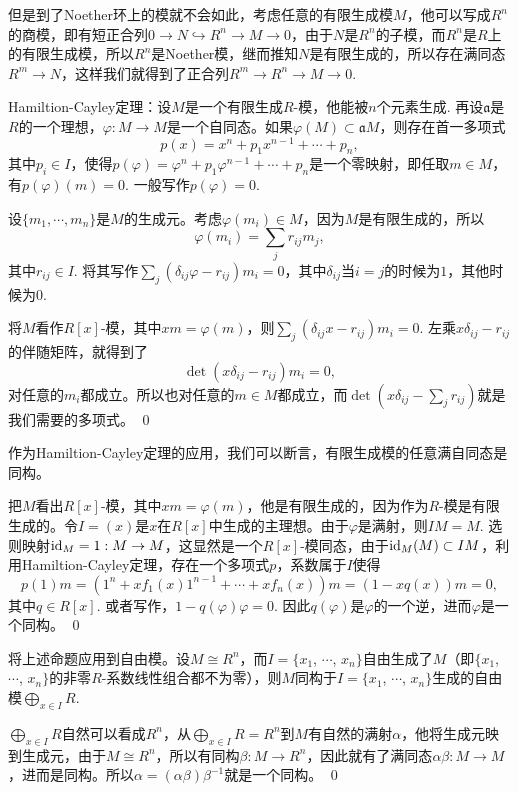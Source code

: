 但是到了Noether环上的模就不会如此，考虑任意的有限生成模$M$，他可以写成$R^n$的商模，即有短正合列$0\to N \hookrightarrow R^n \to M\to 0$，由于$N$是$R^n$的子模，而$R^n$是$R$上的有限生成模，所以$R^n$是Noether模，继而推知$N$是有限生成的，所以存在满同态$R^m\to N$，这样我们就得到了正合列$R^m\to R^n\to M\to 0$.

\theo Hamiltion-Cayley定理：设$M$是一个有限生成$R$-模，他能被$n$个元素生成. 再设$\mathfrak{a}$是$R$的一个理想，$\varphi:M\to M$是一个自同态。如果$\varphi(M)\subset \mathfrak{a}M$，则存在首一多项式
\[
	p(x)=x^n+p_1x^{n-1}+\cdots+p_n,
\]
其中$p_i\in I$，使得$p(\varphi)=\varphi^n+p_1\varphi^{n-1}+\cdots+p_n$是一个零映射，即任取$m\in M$，有$p(\varphi)(m)=0$. 一般写作$p(\varphi)=0$.

\proof
	设$\{m_1,\cdots,m_n\}$是$M$的生成元。考虑$\varphi(m_i)\in M$，因为$M$是有限生成的，所以
	\[
	\varphi(m_i)=\sum_{j}r_{ij}m_j,
	\]
	其中$r_{ij}\in I$. 将其写作$\sum_{j}(\delta_{ij}\varphi-r_{ij})m_i=0$，其中$\delta_{ij}$当$i=j$的时候为$1$，其他时候为$0$.

	将$M$看作$R[x]$-模，其中$xm=\varphi(m)$，则$\sum_{j}(\delta_{ij}x-r_{ij})m_i=0$. 左乘$x\delta_{ij}-r_{
	ij}$的伴随矩阵，就得到了
	\[
	\det\left(x\delta_{ij}-r_{ij}\right)m_i=0,
	\]
	对任意的$m_i$都成立。所以也对任意的$m\in M$都成立，而$\det\left(x\delta_{ij}-\sum_{j}r_{ij}\right)$就是我们需要的多项式。
\qed

\para 作为Hamiltion-Cayley定理的应用，我们可以断言，有限生成模的任意满自同态是同构。

\proof
	把$M$看出$R[x]$-模，其中$xm=\varphi(m)$，他是有限生成的，因为作为$R$-模是有限生成的。令$I=(x)$是$x$在$R[x]$中生成的主理想。由于$\varphi$是满射，则$IM=M$. 选则映射$\operatorname{id}_M=1:M\to M$，这显然是一个$R[x]$-模同态，由于$\operatorname{id}_M(M)\subset IM$，利用Hamiltion-Cayley定理，存在一个多项式$p$，系数属于$I$使得
	\[
	p(1)m=\left(1^n+xf_1(x)1^{n-1}+\cdots+xf_n(x)\right)m=(1-xq(x))m=0,
	\]
	其中$q\in R[x]$. 或者写作，$1-q(\varphi)\varphi=0$. 因此$q(\varphi)$是$\varphi$的一个逆，进而$\varphi$是一个同构。
\qed

\para 将上述命题应用到自由模。设$M\cong R^n$，而$I=\{x_1$, $\cdots$, $x_n\}$自由生成了$M$（即$\{x_1$, $\cdots$, $x_n\}$的非零$R$-系数线性组合都不为零），则$M$同构于$I=\{x_1$, $\cdots$, $x_n\}$生成的自由模$\bigoplus_{x\in I} R$.

\proof
	$\bigoplus_{x\in I} R$自然可以看成$R^n$，从$\bigoplus_{x\in I} R=R^n$到$M$有自然的满射$\alpha$，他将生成元映到生成元，由于$M\cong R^n$，所以有同构$\beta:M\to R^n$，因此就有了满同态$\alpha\beta:M\to M$，进而是同构。所以$\alpha =(\alpha\beta)\beta^{-1}$就是一个同构。
\qed

